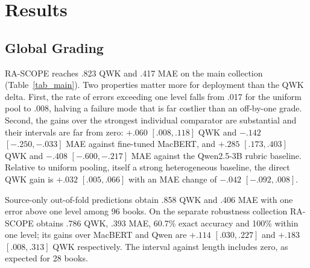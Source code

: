 \documentclass[conference]{IEEEtran}
\begin{document}
\section{Results}

\subsection{Global Grading}
RA-SCOPE reaches .823 QWK and .417 MAE on the main collection
(Table~\ref{tab_main}). Two properties matter more for deployment than the
QWK delta. First, the rate of errors exceeding one level falls from .017 for the
uniform pool to .008, halving a failure mode that is far costlier than an
off-by-one grade. Second, the gains over the strongest individual comparator are
substantial and their intervals are far from zero: $+.060$ $[.008,.118]$ QWK and
$-{.142}$ $[-.250,-.033]$ MAE against fine-tuned MacBERT, and $+.285$
$[.173,.403]$ QWK and $-.408$ $[-.600,-.217]$ MAE against the Qwen2.5-3B rubric
baseline. Relative to uniform pooling, itself a strong heterogeneous
baseline, the direct QWK gain is $+.032$ $[.005,.066]$ with an MAE change of
$-.042$ $[-.092,.008]$.

Source-only out-of-fold predictions obtain .858 QWK and .406 MAE with one error
above one level among 96 books. On the separate robustness collection
RA-SCOPE obtains .786 QWK, .393 MAE, 60.7\% exact accuracy and 100\% within one
level; its gains over MacBERT and Qwen are $+.114$ $[.030,.227]$ and $+.183$
$[.008,.313]$ QWK respectively. The interval against length includes zero, as
expected for 28 books.
\end{document}
